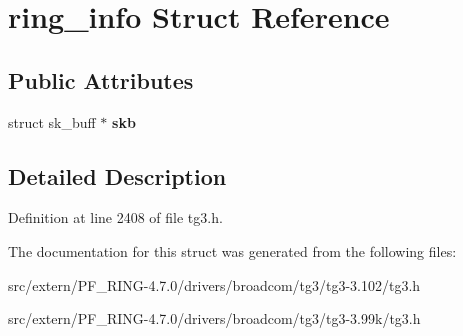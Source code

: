 \hypertarget{structring__info}{
\section{ring\_\-info Struct Reference}
\label{structring__info}
}
\subsection*{Public Attributes}
\begin{DoxyCompactItemize}
\item 
\hypertarget{structring__info_a13d55f9a6211d61b93e67488246c43d7}{
struct sk\_\-buff $\ast$ {\bfseries skb}}
\label{structring__info_a13d55f9a6211d61b93e67488246c43d7}

\end{DoxyCompactItemize}


\subsection{Detailed Description}


Definition at line 2408 of file tg3.h.



The documentation for this struct was generated from the following files:\begin{DoxyCompactItemize}
\item 
src/extern/PF\_\-RING-\/4.7.0/drivers/broadcom/tg3/tg3-\/3.102/tg3.h\item 
src/extern/PF\_\-RING-\/4.7.0/drivers/broadcom/tg3/tg3-\/3.99k/tg3.h\end{DoxyCompactItemize}
